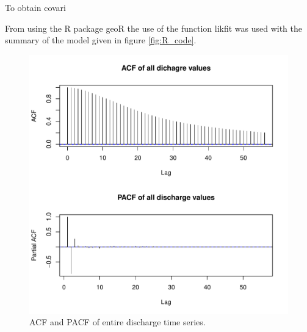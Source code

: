 \documentclass[5p]{elsarticle}
\begin{document}
To obtain covari


From using the R package geoR the use of the function likfit was used with the summary of the model given in figure \ref{fig:R_code}.

\begin{center}
\begin{figure}
\includegraphics[scale=0.5]{acf_pacf.pdf}
\caption{ACF and PACF of entire discharge time series.}
\label{fig:acf_pacf}
\end{figure}
\end{center}
\end{document}
